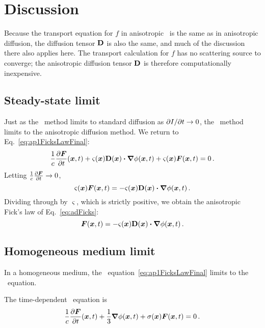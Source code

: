\section{Discussion}

Because the transport equation for $f$ in anisotropic \Pone\ is the same as in
anisotropic diffusion, the diffusion tensor $\mathbf{D}$ is also the same, and much
of the discussion there also applies here.
The transport calculation for $f$ has no scattering source to converge; the
anisotropic diffusion tensor $\mathbf{D}$ is therefore computationally inexpensive.

\subsection{Steady-state limit}
Just as the \Pone\ method limits to standard diffusion as ${\partial I}/{\partial t} \to 0$,
the \APone\ method limits to the anisotropic diffusion method. We return to
Eq.~\eqref{eq:ap1FicksLawFinal}:
\begin{equation*}
  \frac{1}{c}\frac{\partial \bm{F}}{\partial t}(\bm{x},t)
  + \varsigma(\bm{x}) \mathbf{D}(\bm{x}) \bm{\cdot} \bm{\nabla} \phi(\bm{x}, t)
  + \varsigma(\bm{x})\bm{F}(\bm{x},t)
  = 0 \,.
\end{equation*}
Letting $\frac{1}{c}\frac{\partial \bm{F}}{\partial t}\to 0$,
\begin{equation*}
  \varsigma(\bm{x})\bm{F}(\bm{x},t)
  = -\varsigma(\bm{x}) \mathbf{D}(\bm{x}) \bm{\cdot} \bm{\nabla} \phi(\bm{x}, t) \,.
\end{equation*}
Dividing through by $\varsigma$, which is strictly positive, we obtain the
anisotropic Fick's law of Eq.~\eqref{eq:adFicks}:
\begin{equation*}
 \bm{F}(\bm{x},t)
  = -\varsigma(\bm{x}) \mathbf{D}(\bm{x}) \bm{\cdot} \bm{\nabla} \phi(\bm{x}, t) \,. 
\end{equation*}

\subsection{Homogeneous medium limit}
In a homogeneous medium, the \APone\ equation~\eqref{eq:ap1FicksLawFinal} limits
to the \Pone\ equation.

The time-dependent \Pone\ equation is
\begin{equation*}
  \frac{1}{c}\frac{\partial \bm{F}}{\partial t}(\bm{x},t)
  + \frac{1}{3} \bm{\nabla} \phi(\bm{x}, t)
  + \sigma(\bm{x})\bm{F}(\bm{x},t) 
  = 0 \,.
\end{equation*}

